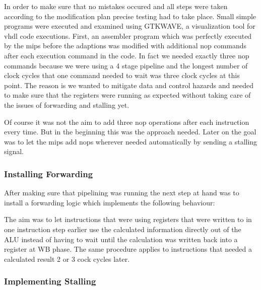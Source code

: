 In order to make sure that no mistakes occured and all steps were taken according to the modification plan precise testing had to take place. Small simple programs were executed and examined using GTKWAVE, a visualization tool for vhdl code executions. First, an assembler program which was perfectly executed by the mips before the adaptions was modified with additional nop commands after each execution command in the code. In fact we needed exactly three nop commands because we were using a 4 stage pipeline and the longest number of clock cycles that one command needed to wait was three clock cycles at this point. The reason is we wanted to mitigate data and control hazards and needed to make sure that the registers were running as expected without taking care of the issues of forwarding and stalling yet. 

Of course it was not the aim to add three nop operations after each instruction every time. But in the beginning this was the approach needed. Later on the goal was to let the mips add nops wherever needed automatically by sending a stalling signal.

\subsubsection{Installing Forwarding}
\label{sec:installingForwarding}

After making sure that pipelining was running the next step at hand was to install a forwarding logic which implements the following behaviour:


The aim was to let instructions that were using registers that were written to in one instruction step earlier use the calculated information directly out of the ALU instead of having to wait until the calculation was written back into a register at WB phase.
The same procedure applies to instructions that needed a calculated result 2 or 3 cock cycles later.
 
\subsubsection{Implementing Stalling}
\label{sec:implementingStalling}

